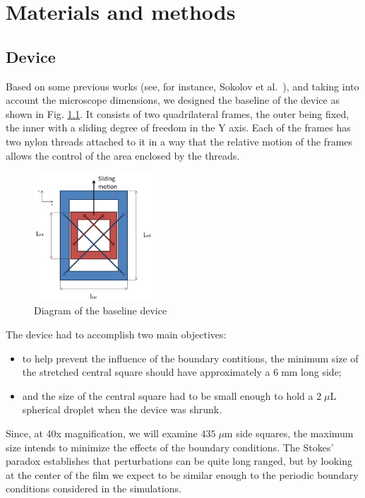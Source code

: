 \chapter{Materials and methods}
\label{materias_methods}

\section{Device}
\label{mm_device}

Based on some previous works (see, for instance, Sokolov et al.~\cite{Sokolov2007}), and taking into account the microscope dimensions, we designed the baseline of the device as shown in Fig. \ref{device_baseline}. It consists of two quadrilateral frames, the outer being fixed, the inner with a sliding degree of freedom in the Y axis. Each of the frames has two nylon threads attached to it in a way that the relative motion of the frames allows the control of the area enclosed by the threads.

\begin{figure}[H]
	\centering
	\includegraphics[width=0.4\textwidth]{archivos/baseline_device.png}
	\caption{Diagram of the baseline device}
	\label{device_baseline}
\end{figure}

The device had to accomplish two main objectives: 

\begin{itemize}
	\item to help prevent the influence of the boundary contitions, the minimum size of the stretched central square should have approximately a $6 \; \textrm{mm}$ long side; 
	\item and the size of the central square had to be small enough to hold a $2 \; \mu \textrm{L}$ spherical droplet when the device was shrunk. 
\end{itemize}

Since, at 40x magnification, we will examine $435 \; \mu \textrm{m}$ side squares, the maximum size intends to minimize the effects of the boundary conditions. The Stokes' paradox establishes that perturbations can be quite long ranged, but by looking at the center of the film we expect to be similar enough to the periodic boundary conditions considered in the simulations.

